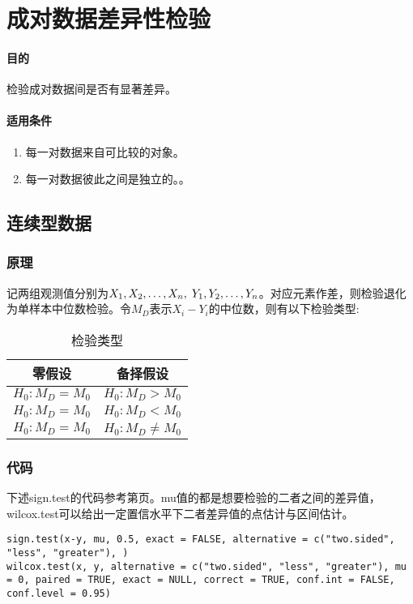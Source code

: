 \section{成对数据差异性检验}

\paragraph{目的}
检验成对数据间是否有显著差异。
\paragraph{适用条件}
\begin{enumerate}
	\item 每一对数据来自可比较的对象。
	\item 每一对数据彼此之间是独立的。。
\end{enumerate}

\subsection{连续型数据}
\subsubsection{原理}
记两组观测值分别为$X_1, X_2, \dots, X_{n},\;Y_1,Y_2,\dots,Y_n$。对应元素作差，则检验退化为单样本中位数检验。令$M_D$表示$X_i-Y_i$的中位数，则有以下检验类型:

\begin{table}[htbp]
	\centering
	\begin{tabular}{cc}
		\toprule
		零假设 & 备择假设 \\
		\midrule 
		$H_0:M_D=M_0$ & $H_0:M_D>M_0$ \\
		$H_0:M_D=M_0$ & $H_0:M_D<M_0$ \\
		$H_0:M_D=M_0$ & $H_0:M_D\ne M_0$ \\
		\bottomrule 
	\end{tabular}
	\caption{检验类型}
\end{table}

\subsubsection{代码}
下述sign.test的代码参考第\pageref{sec:sign.test.code}页。mu值的都是想要检验的二者之间的差异值，wilcox.test可以给出一定置信水平下二者差异值的点估计与区间估计。
\begin{verbatim}
sign.test(x-y, mu, 0.5, exact = FALSE, alternative = c("two.sided", "less", "greater"), )
wilcox.test(x, y, alternative = c("two.sided", "less", "greater"), mu = 0, paired = TRUE, exact = NULL, correct = TRUE, conf.int = FALSE, conf.level = 0.95)
\end{verbatim}

